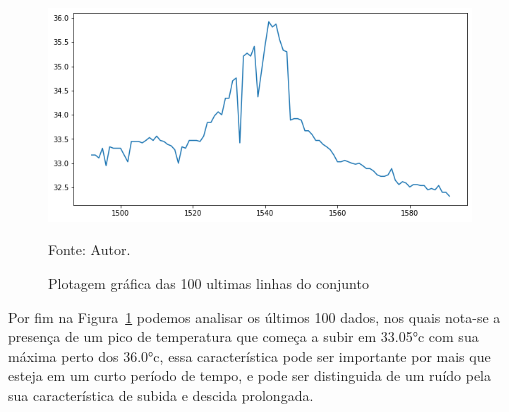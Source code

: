 \begin{figure}[H]
	\centering
	\includegraphics[width=15cm]{imagens/sensores/bruto_100_ultimas.png}
	\caption{Plotagem gráfica das 100 ultimas linhas do conjunto}
	Fonte: Autor.
	\label{fig: bruto_100u}
\end{figure}

Por fim na Figura~\ref{fig: bruto_100u} podemos analisar os últimos 100 dados, nos quais nota-se a presença de um pico de temperatura que começa a subir em \ang{33.05}c com sua máxima perto dos \ang{36.0}c, essa característica pode ser importante por mais que esteja em um curto período de tempo, e pode ser distinguida de um ruído pela sua característica de subida e descida prolongada. 



